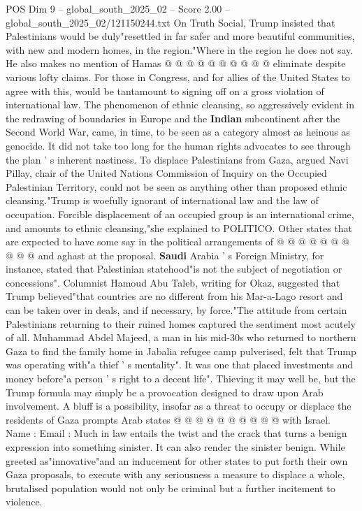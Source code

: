 \begin{textsample}{POS Dim 9 – global\_south\_2025\_02 – Score 2.00 – global\_south\_2025\_02/121150244.txt}
On Truth Social, Trump insisted that Palestinians would be duly"resettled in far safer and more beautiful communities, with new and modern homes, in the region."Where in the region he does not say.
He also makes no mention of Hamas @ @ @ @ @ @ @ @ @ @ eliminate despite various lofty claims.
For those in Congress, and for allies of the United States to agree with this, would be tantamount to signing off on a gross violation of international law.
The phenomenon of ethnic cleansing, so aggressively evident in the redrawing of boundaries in Europe and the \textbf{Indian} subcontinent after the Second World War, came, in time, to be seen as a category almost as heinous as genocide.
It did not take too long for the human rights advocates to see through the plan ' s inherent nastiness.
To displace Palestinians from Gaza, argued Navi Pillay, chair of the United Nations Commission of Inquiry on the Occupied Palestinian Territory, could not be seen as anything other than proposed ethnic cleansing."Trump is woefully ignorant of international law and the law of occupation.
Forcible displacement of an occupied group is an international crime, and amounts to ethnic cleansing,"she explained to POLITICO.
Other states that are expected to have some say in the political arrangements of @ @ @ @ @ @ @ @ @ @ and aghast at the proposal. \textbf{Saudi} Arabia ' s Foreign Ministry, for instance, stated that Palestinian statehood"is not the subject of negotiation or concessions".
Columnist Hamoud Abu Taleb, writing for Okaz, suggested that Trump believed"that countries are no different from his Mar-a-Lago resort and can be taken over in deals, and if necessary, by force."The attitude from certain Palestinians returning to their ruined homes captured the sentiment most acutely of all.
Muhammad Abdel Majeed, a man in his mid-30s who returned to northern Gaza to find the family home in Jabalia refugee camp pulverised, felt that Trump was operating with"a thief ' s mentality".
It was one that placed investments and money before"a person ' s right to a decent life".
Thieving it may well be, but the Trump formula may simply be a provocation designed to draw upon Arab involvement.
A bluff is a possibility, insofar as a threat to occupy or displace the residents of Gaza prompts Arab states @ @ @ @ @ @ @ @ @ @ with Israel.
Name : Email : Much in law entails the twist and the crack that turns a benign expression into something sinister.
It can also render the sinister benign.
While greeted as"innovative"and an inducement for other states to put forth their own Gaza proposals, to execute with any seriousness a measure to displace a whole, brutalised population would not only be criminal but a further incitement to violence.

\end{textsample}
